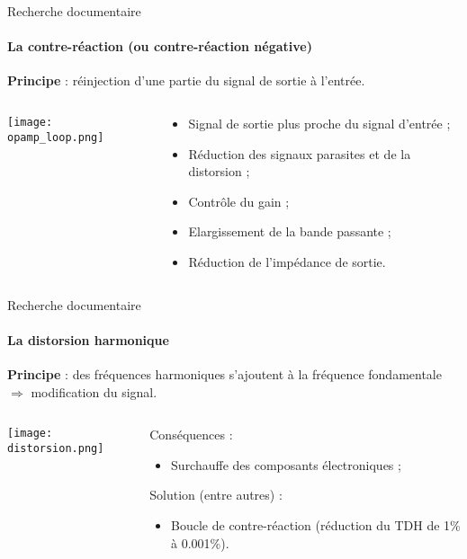\documentclass[pdf]{beamer}
\begin{document}
\begin{frame}{Recherche documentaire}
	\framesubtitle{La contre-réaction (ou contre-réaction négative)}

	\textbf{Principe} : réinjection d'une partie du signal de sortie à l'entrée.

	\begin{columns}
		\begin{column}{5cm}
			\texttt{[image: opamp\_loop.png]}
		\end{column}

		\begin{column}{5cm}
				\begin{itemize}
					\item Signal de sortie plus proche du signal d'entrée ;
					\item	Réduction des signaux parasites et de la distorsion ;
					\item Contrôle du gain ;
					\item Elargissement de la bande passante ;
					\item Réduction de l'impédance de sortie.
				\end{itemize}
		\end{column}
	\end{columns}
\end{frame}

\begin{frame}{Recherche documentaire}
	\framesubtitle{La distorsion harmonique}

	\textbf{Principe} : des fréquences harmoniques s'ajoutent à la fréquence fondamentale
	$\Rightarrow$ modification du signal.

	\bigbreak

	\begin{columns}
		\begin{column}{5cm}
			\texttt{[image: distorsion.png]}
		\end{column}

		\begin{column}{5cm}
			Conséquences :
			\begin{itemize}
				\item	Surchauffe des composants électroniques ;
			\end{itemize}

			Solution (entre autres) :
			\begin{itemize}
				\item Boucle de contre-réaction (réduction du TDH de 1\% à 0.001\%).
			\end{itemize}
		\end{column}
	\end{columns}
\end{frame}
\end{document}
